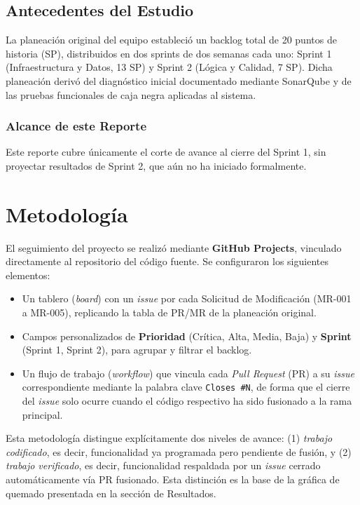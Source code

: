 \documentclass[12pt,letterpaper]{article}
\begin{document}
\subsection{Antecedentes del Estudio}
La planeación original del equipo estableció un backlog total de 20 puntos de historia (SP), distribuidos en dos sprints de dos semanas cada uno: Sprint 1 (Infraestructura y Datos, 13 SP) y Sprint 2 (Lógica y Calidad, 7 SP). Dicha planeación derivó del diagnóstico inicial documentado mediante SonarQube y de las pruebas funcionales de caja negra aplicadas al sistema.

\subsubsection{Alcance de este Reporte}
Este reporte cubre únicamente el corte de avance al cierre del Sprint 1, sin proyectar resultados de Sprint 2, que aún no ha iniciado formalmente.

\newpage
\section{Metodología}
El seguimiento del proyecto se realizó mediante \textbf{GitHub Projects}, vinculado directamente al repositorio del código fuente. Se configuraron los siguientes elementos:

\begin{itemize}
\item Un tablero (\textit{board}) con un \textit{issue} por cada Solicitud de Modificación (MR-001 a MR-005), replicando la tabla de PR/MR de la planeación original.
\item Campos personalizados de \textbf{Prioridad} (Crítica, Alta, Media, Baja) y \textbf{Sprint} (Sprint 1, Sprint 2), para agrupar y filtrar el backlog.
\item Un flujo de trabajo (\textit{workflow}) que vincula cada \textit{Pull Request} (PR) a su \textit{issue} correspondiente mediante la palabra clave \texttt{Closes~\#N}, de forma que el cierre del \textit{issue} solo ocurre cuando el código respectivo ha sido fusionado a la rama principal.
\end{itemize}

Esta metodología distingue explícitamente dos niveles de avance: (1) \textit{trabajo codificado}, es decir, funcionalidad ya programada pero pendiente de fusión, y (2) \textit{trabajo verificado}, es decir, funcionalidad respaldada por un \textit{issue} cerrado automáticamente vía PR fusionado. Esta distinción es la base de la gráfica de quemado presentada en la sección de Resultados.
\end{document}
